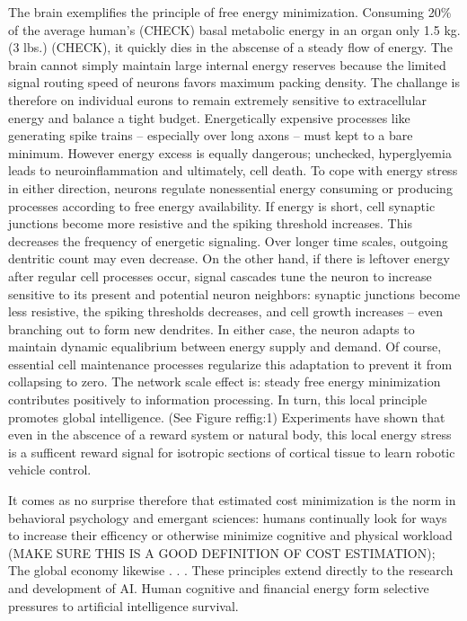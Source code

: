 The brain exemplifies the principle of free energy minimization. Consuming 20\% of the average human's (CHECK) basal metabolic energy in an organ only 1.5 kg. (3 lbs.) (CHECK), it quickly dies in the abscense of a steady flow of energy. The brain cannot simply maintain large internal energy reserves because the limited signal routing speed of neurons favors maximum packing density. The challange is therefore on individual eurons to remain extremely sensitive to extracellular energy and balance a tight budget. Energetically expensive processes like generating spike trains -- especially over long axons -- must kept to a bare minimum. However energy excess is equally dangerous; unchecked, hyperglyemia leads to neuroinflammation and ultimately, cell death. To cope with energy stress in either direction, neurons regulate nonessential energy consuming or producing processes according to free energy availability. If energy is short, cell synaptic junctions become more resistive and the spiking threshold increases. This decreases the frequency of energetic signaling. Over longer time scales, outgoing dentritic count may even decrease. On the other hand, if there is leftover energy after regular cell processes occur, signal cascades tune the neuron to increase sensitive to its present and potential neuron neighbors: synaptic junctions become less resistive, the spiking thresholds decreases, and cell growth increases -- even branching out to form new dendrites. In either case, the neuron adapts to maintain dynamic equalibrium between energy supply and demand. Of course, essential cell maintenance processes regularize this adaptation to prevent it from collapsing to zero. The network scale effect is: steady free energy minimization contributes positively to information processing. In turn, this local principle promotes global intelligence. (See Figure ref{fig:1}) Experiments have shown that even in the abscence of a reward system or natural body, this local energy stress is a sufficent reward signal for isotropic sections of cortical tissue to learn robotic vehicle control. \cite{Vergara2019}

It comes as no surprise therefore that estimated cost minimization is the norm in behavioral psychology and emergant sciences: humans continually look for ways to increase their efficency or otherwise minimize cognitive and physical workload (MAKE SURE THIS IS A GOOD DEFINITION OF COST ESTIMATION); The global economy likewise . . . These principles extend directly to the research and development of AI. Human cognitive and financial energy form selective pressures to artificial intelligence survival.

